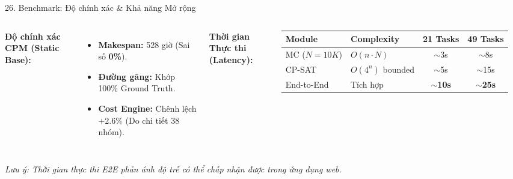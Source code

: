 \begin{frame}{26. Benchmark: Độ chính xác \& Khả năng Mở rộng}
    \begin{columns}
        \textbf{Độ chính xác CPM (Static Base):}
        \vspace{0.2cm}
        \begin{itemize}
            \item \textbf{Makespan:} 528 giờ (Sai số \textbf{0\%}).
            \item \textbf{Đường găng:} Khớp 100\% Ground Truth.
            \item \textbf{Cost Engine:} Chênh lệch $+2.6\%$ (Do chi tiết 38 nhóm).
        \end{itemize}
        
        \textbf{Thời gian Thực thi (Latency):}
        \vspace{0.2cm}
        \begin{table}
            \centering
            \scriptsize
            \begin{tabular}{@{}llcc@{}}
                \toprule
                \textbf{Module} & \textbf{Complexity} & \textbf{21 Tasks} & \textbf{49 Tasks} \\
                \midrule
                MC ($N=10K$) & $O(n \cdot N)$ & $\sim$3s & $\sim$8s \\
                CP-SAT & $O(4^n)$ bounded & $\sim$5s & $\sim$15s \\
                End-to-End & Tích hợp & \textbf{$\sim$10s} & \textbf{$\sim$25s} \\
                \bottomrule
            \end{tabular}
        \end{table}
    \end{columns}
    \vspace{0.5cm}
    \textit{Lưu ý: Thời gian thực thi E2E phản ánh độ trễ có thể chấp nhận được trong ứng dụng web.}
\end{frame}
